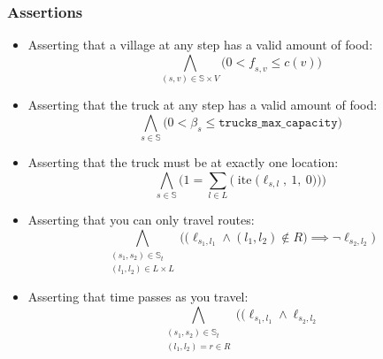         \subsubsection{Assertions}
            \begin{itemize}
                \item 
                    Asserting that a village at any step has a valid amount of food:
                    \[
                        \bigwedge_{(s, v) \in \mathbb{S} \times V} \bigg(
                            0 < \mathit{f}_{s,v} \le c(v)
                        \bigg)
                    \]
                \item 
                    Asserting that the truck at any step has a valid amount of food:
                    \[
                        \bigwedge_{s \in \mathbb{S}} \bigg(
                            0 < \beta_{s} \le \texttt{trucks\_max\_capacity}
                        \bigg)
                    \]
                \item 
                    Asserting that the truck must be at exactly one location:
                    \[
                        \bigwedge_{s \in \mathbb{S}} \bigg(
                            1 = \sum_{l \in L} \Big(
                                \operatorname{ite}\big(
                                    \ell_{s,l},\ 1,\ 0
                                \big)
                            \Big)
                        \bigg)
                    \]
                \item 
                    Asserting that you can only travel routes:
                    \[
                        \bigwedge_{\substack{
                            (s_1, s_2) \in \mathbb{S}_t \\
                            (l_1, l_2) \in L \times L
                        }} \bigg(
                            \Big( 
                                    \ell_{s_1,l_1}
                                \wedge
                                    (l_1, l_2) \not \in R
                            \Big) \implies \neg \ell_{s_2,l_2}
                        \bigg)
                    \]
                \item 
                    Asserting that time passes as you travel:
                    \[
                        \bigwedge_{\substack{
                            (s_1, s_2) \in \mathbb{S}_t \\
                            (l_1, l_2) = r \in R
                        }} \bigg(
                            \Big( 
                                \ell_{s_1,l_1} \wedge \ell_{s_2,l_2}
\]
\end{itemize}
